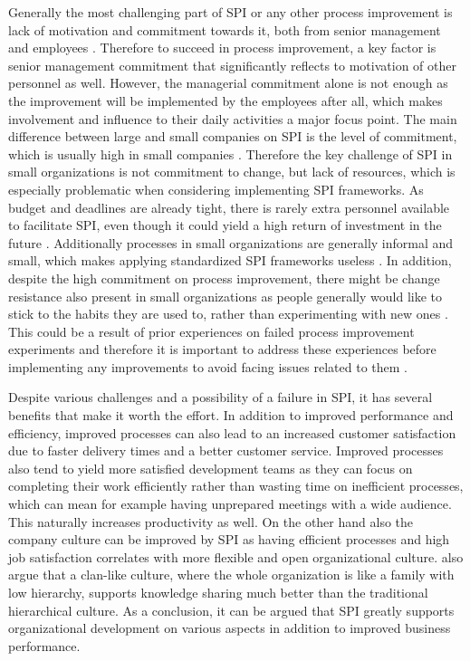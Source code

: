 Generally the most challenging part of SPI or any other process improvement is lack of motivation and commitment towards it, both from senior management and employees \citep{Allison2010}.
Therefore to succeed in process improvement, a key factor is senior management commitment that significantly reflects to motivation of other personnel as well. However, the managerial commitment alone is
not enough as the improvement will be implemented by the employees after all, which makes involvement and influence to their daily activities a major focus point. \citep{Herranz2014}
The main difference between large and small companies on SPI is the level of commitment, which is usually high in small companies \citep{Basri2010a}. Therefore the key challenge
of SPI in small organizations is not commitment to change, but lack of resources, which is especially problematic when considering implementing SPI frameworks. As budget and deadlines
are already tight, there is rarely extra personnel available to facilitate SPI, even though it could yield a high return of investment in the future \citep{Allison2010}\citep{Larrucea2016}.
Additionally processes in small organizations are generally informal and small, which makes applying standardized SPI frameworks useless \citep{Basri2010a}. In addition, despite the high
commitment on process improvement, there might be change resistance also present in small organizations as people generally would like to stick to the habits they are used to, rather than
experimenting with new ones \citep{Larrucea2016}. This could be a result of prior experiences on failed process improvement experiments and therefore it is important to address these
experiences before implementing any improvements to avoid facing issues related to them \citep{Allison2010}.

Despite various challenges and a possibility of a failure in SPI, it has several benefits that make it worth the effort. In addition to improved performance and efficiency, improved processes
can also lead to an increased customer satisfaction due to faster delivery times and a better customer service. Improved processes also tend to yield more satisfied development
teams as they can focus on completing their work efficiently rather than wasting time on inefficient processes, which can mean for example having unprepared meetings with a wide audience.
This naturally increases productivity as well. \citep{Sulayman2009} On the other hand also the company culture can be improved by SPI as having efficient processes and high job satisfaction
correlates with more flexible and open organizational culture. \citet{Lee2016} also argue that a clan-like culture, where the whole organization is like a family with low hierarchy, supports
knowledge sharing much better than the traditional hierarchical culture. As a conclusion, it can be argued that SPI greatly supports organizational development on various aspects in addition to
improved business performance.

